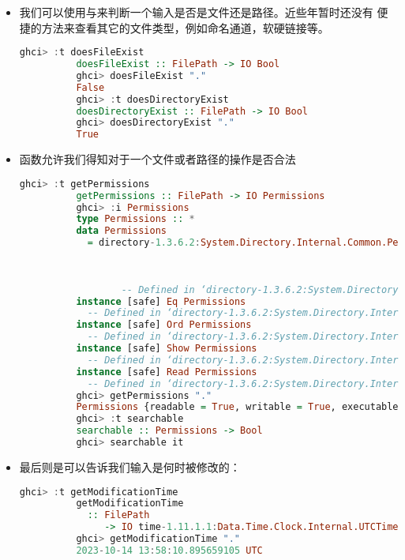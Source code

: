 \documentclass[./main.tex]{subfiles}
\begin{document}
\begin{itemize}
  \item 我们可以使用与来判断一个输入是否是文件还是路径。近些年暂时还没有
        便捷的方法来查看其它的文件类型，例如命名通道，软硬链接等。

        \begin{lstlisting}[language=Haskell]
          ghci> :t doesFileExist
          doesFileExist :: FilePath -> IO Bool
          ghci> doesFileExist "."
          False
          ghci> :t doesDirectoryExist
          doesDirectoryExist :: FilePath -> IO Bool
          ghci> doesDirectoryExist "."
          True
        \end{lstlisting}
  \item {}函数允许我们得知对于一个文件或者路径的操作是否合法

        \begin{lstlisting}[language=Haskell]
          ghci> :t getPermissions
          getPermissions :: FilePath -> IO Permissions
          ghci> :i Permissions
          type Permissions :: *
          data Permissions
            = directory-1.3.6.2:System.Directory.Internal.Common.Permissions {readable :: Bool,
                                                                              writable :: Bool,
                                                                              executable :: Bool,
                                                                              searchable :: Bool}
                  -- Defined in ‘directory-1.3.6.2:System.Directory.Internal.Common’
          instance [safe] Eq Permissions
            -- Defined in ‘directory-1.3.6.2:System.Directory.Internal.Common’
          instance [safe] Ord Permissions
            -- Defined in ‘directory-1.3.6.2:System.Directory.Internal.Common’
          instance [safe] Show Permissions
            -- Defined in ‘directory-1.3.6.2:System.Directory.Internal.Common’
          instance [safe] Read Permissions
            -- Defined in ‘directory-1.3.6.2:System.Directory.Internal.Common’
          ghci> getPermissions "."
          Permissions {readable = True, writable = True, executable = False, searchable = True}
          ghci> :t searchable
          searchable :: Permissions -> Bool
          ghci> searchable it
        \end{lstlisting}
  \item 最后则是可以告诉我们输入是何时被修改的：
        \begin{lstlisting}[language=Haskell]
          ghci> :t getModificationTime
          getModificationTime
            :: FilePath
               -> IO time-1.11.1.1:Data.Time.Clock.Internal.UTCTime.UTCTime
          ghci> getModificationTime "."
          2023-10-14 13:58:10.895659105 UTC
        \end{lstlisting}
\end{itemize}
\end{document}
